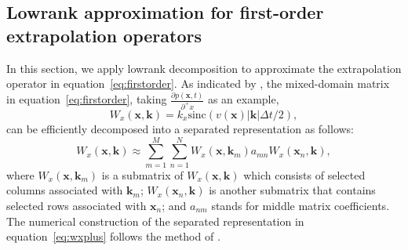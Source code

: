 \subsection{Lowrank approximation for first-order extrapolation operators}

In this section, we apply lowrank decomposition to approximate the extrapolation   operator in equation~\ref{eq:firstorder}. As indicated by \cite{fomellowrank2010,fomellowrankgp}, the mixed-domain matrix in equation~\ref{eq:firstorder}, taking $\displaystyle \frac{\partial p(\mathbf{x},t)}{\partial^+x}$ as an example,
\begin{equation}
\label{eq:operator}
W_x(\mathbf{x}, \mathbf{k}) = k_x\mbox{sinc}(v(\mathbf{x})\left|\mathbf{k}\right|\Delta t/2),
\end{equation}
can be efficiently decomposed into a separated representation as follows:
\begin{equation}
\label{eq:wxplus}
W_x(\mathbf{x}, \mathbf{k}) \approx \sum\limits_{m=1}^M\sum\limits_{n=1}^N W_x(\mathbf{x}, \mathbf{k}_m)a_{mn}W_x(\mathbf{x}_n, \mathbf{k}),
\end{equation}
where $W_x(\mathbf{x}, \mathbf{k}_m)$ is a submatrix of $W_x(\mathbf{x}, \mathbf{k})$ which consists of selected columns associated with $\mathbf{k}_m$; $W_x(\mathbf{x}_n,  \mathbf{k})$ is another submatrix that contains selected rows associated with $\mathbf{x}_n$; and $a_{nm}$ stands for middle matrix coefficients. The numerical construction of the separated representation in equation~\ref{eq:wxplus} follows the method of \cite{eng2009}.


